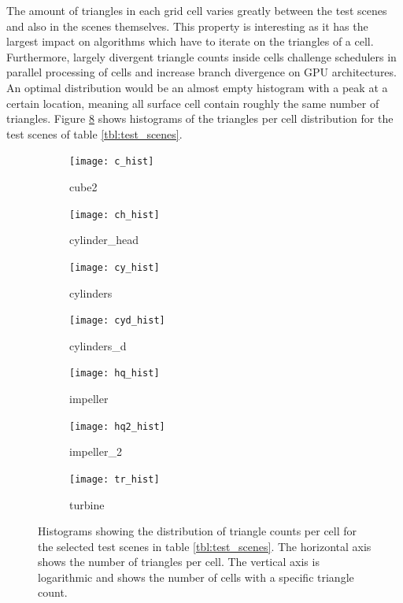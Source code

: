 The amount of triangles in each grid cell varies greatly between the test scenes and also in the scenes themselves.
This property is interesting as it has the largest impact on algorithms which have to iterate on the triangles of a cell.
Furthermore, largely divergent triangle counts inside cells challenge schedulers in parallel processing of cells and increase branch divergence on GPU architectures.
An optimal distribution would be an almost empty histogram with a peak at a certain location, meaning all surface cell contain roughly the same number of triangles.
Figure \ref{fig:histograms} shows histograms of the triangles per cell distribution for the test scenes of table \ref{tbl:test_scenes}.
%
\begin{figure}[!]
	\centering
	\begin{subfigure}[b]{0.49\textwidth}
		\centering
		\texttt{[image: c\_hist]}
		\caption{cube2}
		\label{fig:cube2_histogram}
	\end{subfigure}
	\begin{subfigure}[b]{0.49\textwidth}
		\centering
		\texttt{[image: ch\_hist]}
		\caption{cylinder\_head}
		\label{fig:cylinder_head_histogram}
	\end{subfigure}
	\begin{subfigure}[b]{0.49\textwidth}
		\centering
		\texttt{[image: cy\_hist]}
		\caption{cylinders}
		\label{fig:cylinders_histogram}
	\end{subfigure}
	\begin{subfigure}[b]{0.49\textwidth}
		\centering
		\texttt{[image: cyd\_hist]}
		\caption{cylinders\_d}
		\label{fig:cylinders_d_histogram}
	\end{subfigure}
	\begin{subfigure}[b]{0.49\textwidth}
		\centering
		\texttt{[image: hq\_hist]}
		\caption{impeller}
		\label{fig:impeller_histogram}
	\end{subfigure}
	\begin{subfigure}[b]{0.49\textwidth}
		\centering
		\texttt{[image: hq2\_hist]}
		\caption{impeller\_2}
		\label{fig:impeller_2_histogram}
	\end{subfigure}
	\begin{subfigure}[b]{0.49\textwidth}
		\centering
		\texttt{[image: tr\_hist]}
		\caption{turbine}
		\label{fig:turbine_histogram}
	\end{subfigure}
	\caption{
		Histograms showing the distribution of triangle counts per cell for the selected test scenes in table \ref{tbl:test_scenes}.
		The horizontal axis shows the number of triangles per cell.
		The vertical axis is logarithmic and shows the number of cells with a specific triangle count.
	}
	\label{fig:histograms}
\end{figure}
